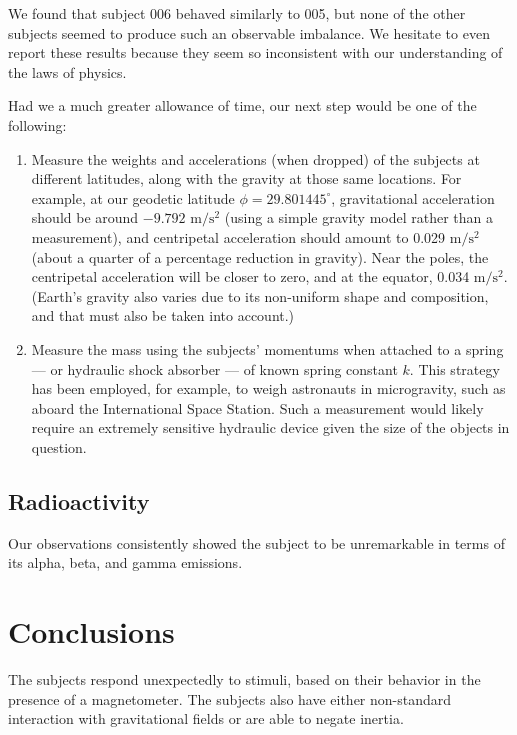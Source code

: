 \documentclass[10pt]{article}
\theoremstyle{definition}
\begin{document}
We found that subject 006 behaved similarly to 005, but none of the other subjects seemed to produce such an observable imbalance.
We hesitate to even report these results because they seem so inconsistent with our understanding of the laws of physics.

Had we a much greater allowance of time, our next step would be one of the following:
\begin{enumerate}
\item Measure the weights and accelerations (when dropped) of the subjects at different latitudes, along with the gravity at those same locations. For example, at our geodetic latitude $\phi=29.801445^\circ$, gravitational acceleration should be around $-9.792\textrm{ m}/\textrm{s}^2$ (using a simple gravity model rather than a measurement), and centripetal acceleration should amount to 0.029 $\textrm{m}/\textrm{s}^2$ (about a quarter of a percentage reduction in gravity). Near the poles, the centripetal acceleration will be closer to zero, and at the equator, 0.034 $\textrm{m}/\textrm{s}^2$. (Earth's gravity also varies due to its non-uniform shape and composition, and that must also be taken into account.)
\item Measure the mass using the subjects' momentums when attached to a spring --- or hydraulic shock absorber --- of known spring constant $k$. This strategy has been employed, for example, to weigh astronauts in microgravity, such as aboard the International Space Station. Such a measurement would likely require an extremely sensitive hydraulic device given the size of the objects in question.
\end{enumerate}

\subsection{Radioactivity}
Our observations consistently showed the subject to be unremarkable in terms of its alpha, beta, and gamma emissions.

\section{Conclusions}\label{conclusions}
The subjects respond unexpectedly to stimuli, based on their behavior in the presence of a magnetometer. The subjects also have either non-standard interaction with gravitational fields or are able to negate inertia.
\end{document}
